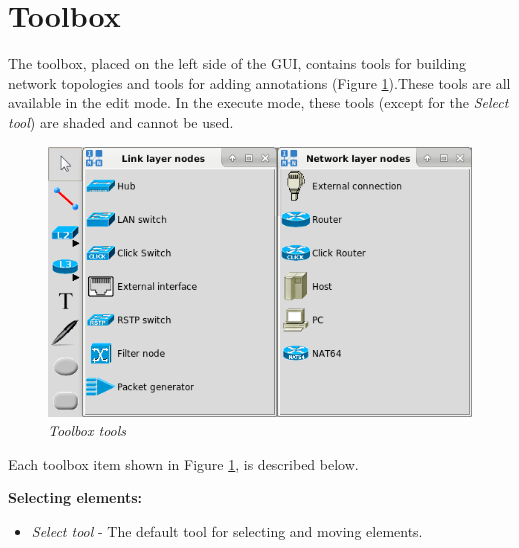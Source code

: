 \section{Toolbox}
\label{sec:toolbox}
The toolbox, placed on the left side of the GUI, contains tools for building
network topologies and tools for adding annotations (Figure
\ref{fig:toolbox_tools}).These tools are all available in the edit mode. In
the execute mode, these tools (except for the \emph{Select tool}) are shaded
and cannot be used.

\begin{figure}[H]
\centering
\vspace{10pt}
\includegraphics[width=\textwidth]{./images/toolbox.png}
\caption{\emph{Toolbox tools}}
\label{fig:toolbox_tools}
\end{figure}

Each toolbox item shown in Figure \ref{fig:toolbox_tools}, is described below.

  \textbf{Selecting elements:} \hfill
  \begin{itemize}
  \item \emph{Select tool} - The default tool for selecting and moving elements.
  \end{itemize}

